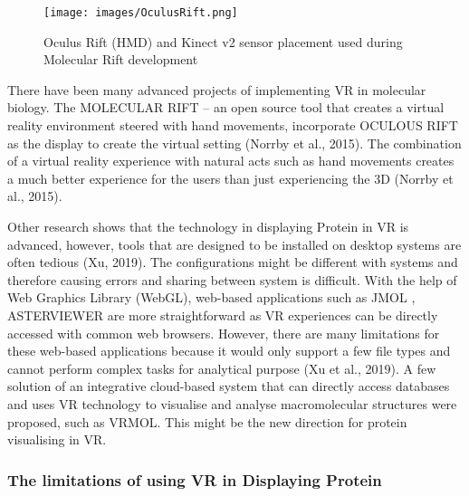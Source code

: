 \begin{figure}[!htp]
	\centering
	\texttt{[image: images/OculusRift.png]}
	\caption{Oculus Rift (HMD) and Kinect v2 sensor placement used during Molecular Rift development}
	\label{OculusRift}
\end{figure}


There have been many advanced projects of implementing VR in molecular biology. The {\footnotesize MOLECULAR RIFT} – an open source tool that creates a virtual reality environment steered with hand movements, incorporate {\footnotesize OCULOUS RIFT} as the display to create the virtual setting (Norrby et al., 2015). The combination of a virtual reality experience with natural acts such as hand movements creates a much better experience for the users than just experiencing the 3D (Norrby et al., 2015).

Other research shows that the technology in displaying Protein in VR is advanced, however, tools that are designed to be installed on desktop systems are often tedious (Xu, 2019).  The configurations might be different with systems and therefore causing errors and sharing between system is difficult. With the help of Web Graphics Library (WebGL), web-based applications such as {\footnotesize JMOL} , {\footnotesize ASTERVIEWER} are more straightforward as VR experiences can be directly accessed with common web browsers. However, there are many limitations for these web-based applications because it would only support a few file types and cannot perform complex tasks for analytical purpose (Xu et al., 2019). A few solution of an integrative cloud-based system that can directly access databases and uses VR technology to visualise and analyse macromolecular structures were proposed, such as {\footnotesize VRMOL}. This might be the new direction for protein visualising in VR.

\subsubsection{The limitations of using VR in Displaying Protein}

